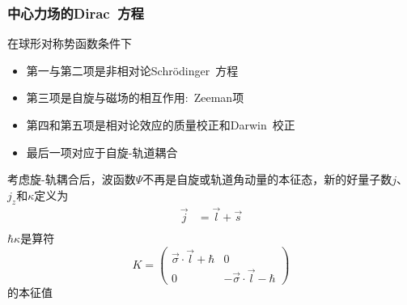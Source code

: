 {\frame
{
	\frametitle{中心力场的\textrm{Dirac~}方程}
	在球形对称势函数条件下
	\fontsize{9.5pt}{5.2pt}
	\begin{itemize}
		\item 第一与第二项是非相对论\textrm{Schr\"odinger~}方程
		\item 第三项是自旋与磁场的相互作用:~\textrm{Zeeman}项
		\item 第四和第五项是相对论效应的质量校正和\textrm{Darwin~}校正
		\item 最后一项对应于自旋-轨道耦合
	\end{itemize}
	考虑旋-轨耦合后，波函数$\Psi$不再是自旋或轨道角动量的本征态，新的好量子数$j$、$j_z$和$\kappa$定义为
	$$\begin{aligned}
		\vec j&=\vec l+\vec s\\
	\end{aligned}$$
	$\hbar\kappa$是算符
	\begin{displaymath}
		K=\left( 
		\begin{matrix}
			\vec{\sigma}\cdot\vec l+\hbar &0\\
			0 &-\vec{\sigma}\cdot\vec l-\hbar
		\end{matrix}
		\right)
	\end{displaymath}
	的本征值
%	
}

}
